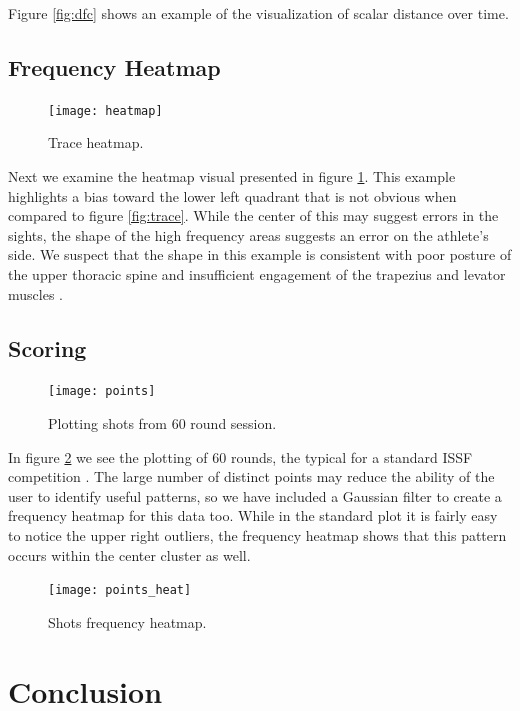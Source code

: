 \documentclass[conference]{IEEEtran}
\begin{document}
Figure \ref{fig:dfc} shows an example of the visualization of scalar distance over time. 

\subsection{Frequency Heatmap}

\begin{figure}[]
	\centering
	\texttt{[image: heatmap]}
	\caption{Trace heatmap.}
	\label{fig:heatmap}
\end{figure}

Next we examine the heatmap visual presented in figure \ref{fig:heatmap}.
This example highlights a bias toward the lower left quadrant that is not obvious when compared to figure \ref{fig:trace}.
While the center of this may suggest errors in the sights, the shape of the high frequency areas suggests an error on the athlete's side.
We suspect that the shape in this example is consistent with poor posture of the upper thoracic spine and insufficient engagement of the trapezius and levator muscles \cite{Simo2018}.

\subsection{Scoring}

\begin{figure}[b]
	\centering
	\texttt{[image: points]}
	\caption{Plotting shots from 60 round session.}
	\label{fig:points}
\end{figure}

In figure \ref{fig:points} we see the plotting of 60 rounds, the typical for a standard ISSF competition \cite{issfRules}.
The large number of distinct points may reduce the ability of the user to identify useful patterns, so we have included a Gaussian filter to create a frequency heatmap for this data too.
While in the standard plot it is fairly easy to notice the upper right outliers,
the frequency heatmap shows that this pattern occurs within the center cluster as well.

\begin{figure}[b]
	\centering
	\texttt{[image: points\_heat]}
	\caption{Shots frequency heatmap.}
	\label{fig:points_heat}
\end{figure}


\section{Conclusion}
\end{document}

